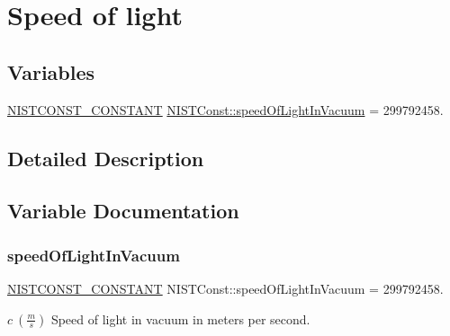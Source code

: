 \hypertarget{group___n_i_s_t_const-_speed_of_light}{}\section{Speed of light}
\label{group___n_i_s_t_const-_speed_of_light}
\subsection*{Variables}
\begin{DoxyCompactItemize}
\item 
\mbox{\hyperlink{group___n_i_s_t_const-_macros_ga2b0fc1d7452373f816175dd86ce26729}{N\+I\+S\+T\+C\+O\+N\+S\+T\+\_\+\+C\+O\+N\+S\+T\+A\+NT}} \mbox{\hyperlink{group___n_i_s_t_const-_speed_of_light_ga5b7c240e787216aab4b730470074888e}{N\+I\+S\+T\+Const\+::speed\+Of\+Light\+In\+Vacuum}} = 299792458.
\end{DoxyCompactItemize}


\subsection{Detailed Description}


\subsection{Variable Documentation}
\mbox{\label{group___n_i_s_t_const-_speed_of_light_ga5b7c240e787216aab4b730470074888e}} 
\subsubsection{\texorpdfstring{speed\+Of\+Light\+In\+Vacuum}{speedOfLightInVacuum}}
{\footnotesize\ttfamily \mbox{\hyperlink{group___n_i_s_t_const-_macros_ga2b0fc1d7452373f816175dd86ce26729}{N\+I\+S\+T\+C\+O\+N\+S\+T\+\_\+\+C\+O\+N\+S\+T\+A\+NT}} N\+I\+S\+T\+Const\+::speed\+Of\+Light\+In\+Vacuum = 299792458.}

$c \ (\frac{m}{s})$ Speed of light in vacuum in meters per second. 